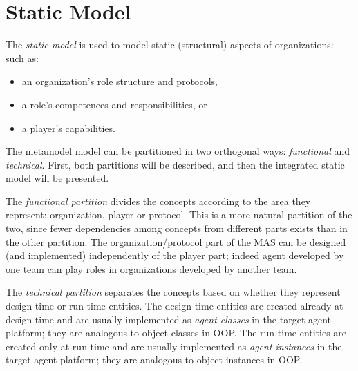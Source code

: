 
\section{Static Model}

The \textit{static model} is used to model static (structural) aspects of organizations: such as:
\begin{itemize}
	\item an organization's role structure and protocols,
	\item a role's competences and responsibilities, or
	\item a player's capabilities.
\end{itemize}

The metamodel model can be partitioned in two orthogonal ways: \textit{functional} and \textit{technical}.
First, both partitions will be described, and then the integrated static model will be presented.

The \textit{functional partition} divides the concepts according to the area they represent: organization, player or protocol.
This is a more natural partition of the two, since fewer dependencies among concepts from different parts exists than in the other partition.
The organization/protocol part of the MAS can be designed (and implemented) independently of the player part; indeed agent developed by one team can play roles in organizations developed by another team.

The \textit{technical partition} separates the concepts based on whether they represent design-time or run-time entities.
The design-time entities are created already at design-time and are usually implemented as \textit{agent classes} in the target agent platform; they are analogous to object classes in OOP.
The run-time entities are created only at run-time and are usually implemented as \textit{agent instances} in the target agent platform; they are analogous to object instances in OOP.

